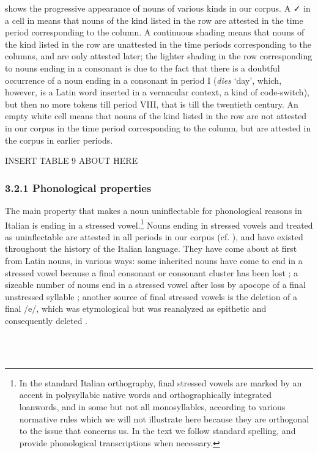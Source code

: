 \documentclass[output=paper]{langscibook}
\begin{document}
 shows the progressive appearance of nouns of various kinds in our corpus. A ✓ in a cell in  means that nouns of the kind listed in the row are attested in the time period corresponding to the column. A continuous shading means that nouns of the kind listed in the row are unattested in the time periods corresponding to the columns, and are only attested later; the lighter shading in the row corresponding to nouns ending in a consonant is due to the fact that there is a doubtful occurrence of a noun ending in a consonant in period I (\textit{dies} ‘day’, which, however, is a Latin word inserted in a vernacular context, a kind of code-switch), but then no more tokens till period VIII, that is till the twentieth century. An empty white cell means that nouns of the kind listed in the row are not attested in our corpus in the time period corresponding to the column, but are attested in the corpus in earlier periods.

INSERT TABLE 9 ABOUT HERE

\subsubsection{3.2.1 Phonological properties}

The main property that makes a noun uninflectable for phonological reasons in Italian is ending in a stressed vowel.\footnote{In the standard Italian orthography, final stressed vowels are marked by an accent in polysyllabic native words and orthographically integrated loanwords, and in some but not all monosyllables, according to various normative rules which we will not illustrate here because they are orthogonal to the issue that concerns us. In the text we follow standard spelling, and provide phonological transcriptions when necessary.} Nouns ending in stressed vowels and treated as uninflectable are attested in all periods in our corpus (cf. ), and have existed throughout the history of the Italian language. They have come about at first from Latin nouns, in various ways: some inherited nouns have come to end in a stressed vowel because a final consonant or consonant cluster has been lost ; a sizeable number of nouns end in a stressed vowel after loss by apocope of a final unstressed syllable ; another source of final stressed vowels is the deletion of a final /e/, which was etymological but was reanalyzed as epithetic and consequently deleted .

\ea%
    \label{ex:key:3}
    \gll \\
         \\
    \glt
    \z %
\end{document}
